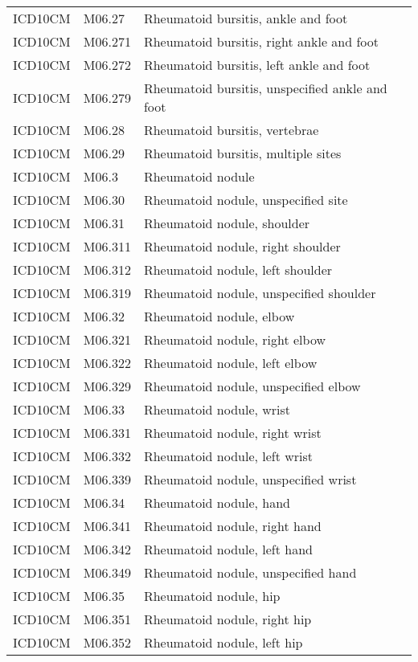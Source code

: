 \begin{table}[ht]
\begin{tabular}{lll}
  ICD10CM & M06.27 & Rheumatoid bursitis, ankle and foot \\ 
  ICD10CM & M06.271 & Rheumatoid bursitis, right ankle and foot \\ 
  ICD10CM & M06.272 & Rheumatoid bursitis, left ankle and foot \\ 
  ICD10CM & M06.279 & Rheumatoid bursitis, unspecified ankle and foot \\ 
  ICD10CM & M06.28 & Rheumatoid bursitis, vertebrae \\ 
  ICD10CM & M06.29 & Rheumatoid bursitis, multiple sites \\ 
  ICD10CM & M06.3 & Rheumatoid nodule \\ 
  ICD10CM & M06.30 & Rheumatoid nodule, unspecified site \\ 
  ICD10CM & M06.31 & Rheumatoid nodule, shoulder \\ 
  ICD10CM & M06.311 & Rheumatoid nodule, right shoulder \\ 
  ICD10CM & M06.312 & Rheumatoid nodule, left shoulder \\ 
  ICD10CM & M06.319 & Rheumatoid nodule, unspecified shoulder \\ 
  ICD10CM & M06.32 & Rheumatoid nodule, elbow \\ 
  ICD10CM & M06.321 & Rheumatoid nodule, right elbow \\ 
  ICD10CM & M06.322 & Rheumatoid nodule, left elbow \\ 
  ICD10CM & M06.329 & Rheumatoid nodule, unspecified elbow \\ 
  ICD10CM & M06.33 & Rheumatoid nodule, wrist \\ 
  ICD10CM & M06.331 & Rheumatoid nodule, right wrist \\ 
  ICD10CM & M06.332 & Rheumatoid nodule, left wrist \\ 
  ICD10CM & M06.339 & Rheumatoid nodule, unspecified wrist \\ 
  ICD10CM & M06.34 & Rheumatoid nodule, hand \\ 
  ICD10CM & M06.341 & Rheumatoid nodule, right hand \\ 
  ICD10CM & M06.342 & Rheumatoid nodule, left hand \\ 
  ICD10CM & M06.349 & Rheumatoid nodule, unspecified hand \\ 
  ICD10CM & M06.35 & Rheumatoid nodule, hip \\ 
  ICD10CM & M06.351 & Rheumatoid nodule, right hip \\ 
  ICD10CM & M06.352 & Rheumatoid nodule, left hip \\ 

\end{tabular}
\end{table}
